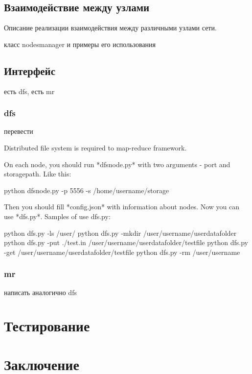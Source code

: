 \documentclass[12pt,a4paper,oneside]{extarticle}
\begin{document}
    \subsection{Взаимодействие между узлами}

        Описание реализации взаимодействия между различными узлами сети.

        класс nodesmanager и примеры его использования

    \clearpage

    \subsection{Интерфейс}

        есть dfs, есть mr

        \subsubsection{dfs}
            перевести

            Distributed file system is required to map-reduce framework.

            On each node, you should run *dfsnode.py* with two arguments - port and storagepath. Like this:


                python dfsnode.py -p 5556 -s /home/username/storage


            Then you should fill *config.json* with information about nodes. Now you can use *dfs.py*. Samples of use dfs.py:


                python dfs.py -ls /user/
                python dfs.py -mkdir /user/username/userdatafolder
                python dfs.py -put ./test.in /user/username/userdatafolder/testfile
                python dfs.py -get /user/username/userdatafolder/testfile
                python dfs.py -rm /user/username
        \subsubsection{mr}
            написать аналогично dfs
    \clearpage  


\clearpage

\section{Тестирование}
    
        
\clearpage

\section{Заключение}
\end{document}
